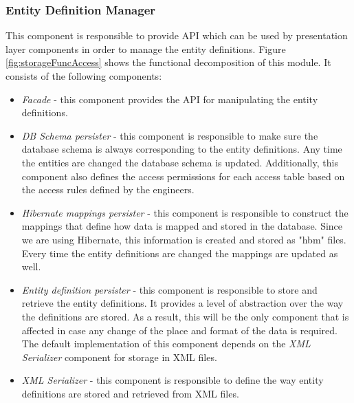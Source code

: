 \subsubsection{Entity Definition Manager}
This component is responsible to provide API which can be used by presentation layer components in order to manage the entity definitions. Figure \ref{fig:storageFuncAccess} shows the functional decomposition of this module. It consists of the following components:

\begin{itemize}
	\item \textit{Facade} - this component provides the API for manipulating the entity definitions.
	
	\item \textit{DB Schema persister} - this component is responsible to make sure the database schema is always corresponding to the entity definitions. Any time the entities are changed the database schema is updated. Additionally, this component also defines the access permissions for each access table based on the access rules defined by the engineers.
	
	\item \textit{Hibernate mappings persister} - this component is responsible to construct the mappings that define how data is mapped and stored in the database. Since we are using Hibernate, this information is created and stored as "hbm" files. Every time the entity definitions are changed the mappings are updated as well.
	
	\item \textit{Entity definition persister} - this component is responsible to store and retrieve the entity definitions. It provides a level of abstraction over the way the definitions are stored. As a result, this will be the only component that is affected in case any change of the place and format of the data is required. The default implementation of this component depends on the \textit{XML Serializer} component for storage in XML files.
	
	\item \textit{XML Serializer} -  this component is responsible to define the way entity definitions are stored and retrieved from XML files.
\end{itemize}


